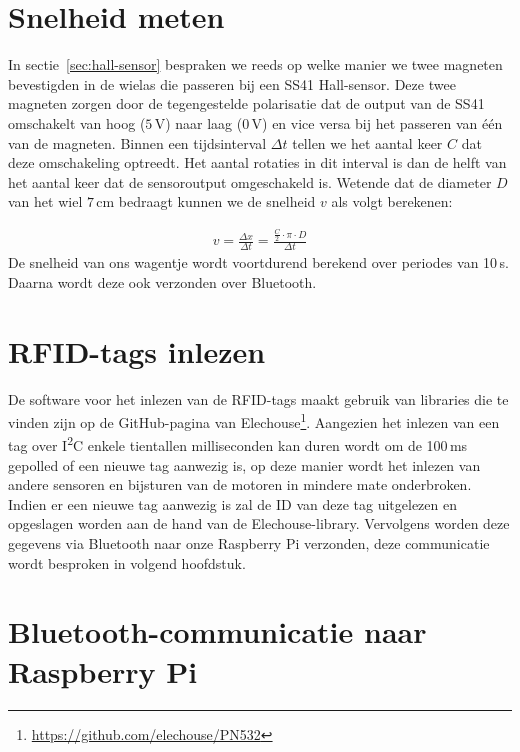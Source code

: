 \section{Snelheid meten}
In sectie~\vref{sec:hall-sensor} bespraken we reeds op welke manier we twee magneten bevestigden in de wielas die passeren bij een SS41 Hall-sensor.
Deze twee magneten zorgen door de tegengestelde polarisatie dat de output van de SS41 omschakelt van hoog ($5\,\mathrm{V}$) naar laag ($0\,\mathrm{V}$) en vice versa bij het passeren van \'e\'en van de magneten. 
Binnen een tijdsinterval $\Delta t$ tellen we het aantal keer $C$ dat deze omschakeling optreedt. Het aantal rotaties in dit interval is dan de helft van het aantal keer dat de sensoroutput omgeschakeld is. Wetende dat de diameter $D$ van het wiel $7\,\mathrm{cm}$ bedraagt kunnen we de snelheid $v$ als volgt berekenen:

\begin{gather*}
v=\frac{\Delta x}{\Delta t} = \frac{\frac{C}{2}\cdot\pi\cdot D}{\Delta t}
\end{gather*}
De snelheid van ons wagentje wordt voortdurend berekend over periodes van 10\,s. Daarna wordt deze ook verzonden over Bluetooth.

\section{RFID-tags inlezen}
De software voor het inlezen van de RFID-tags maakt gebruik van libraries die te vinden zijn op de GitHub-pagina van Elechouse\footnote{\url{https://github.com/elechouse/PN532}}. Aangezien het inlezen van een tag over I\textsuperscript{2}C enkele tientallen milliseconden kan duren wordt om de 100\,ms gepolled of een nieuwe tag aanwezig is, op deze manier wordt het inlezen van andere sensoren en bijsturen van de motoren in mindere mate onderbroken. Indien er een nieuwe tag aanwezig is zal de ID van deze tag uitgelezen en opgeslagen worden aan de hand van de Elechouse-library. Vervolgens worden deze gegevens via Bluetooth naar onze Raspberry Pi verzonden, deze communicatie wordt besproken in volgend hoofdstuk.

\section{Bluetooth-communicatie naar Raspberry Pi}\label{sec:bluetooth-communicatie-naar-raspberry-pi}
